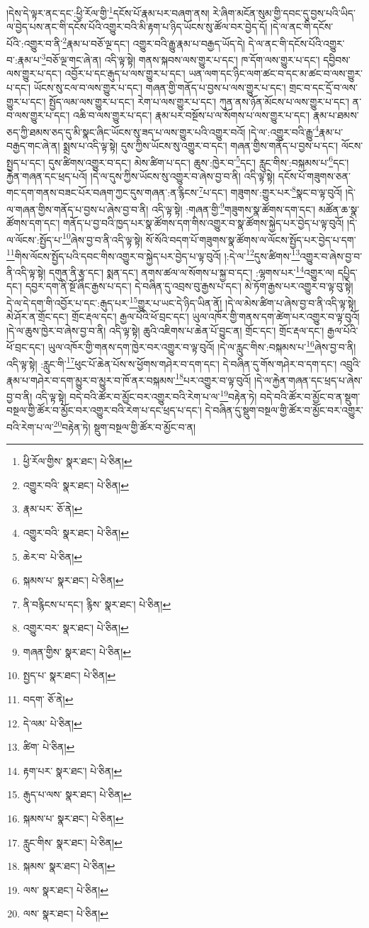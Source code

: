 །དེས་དེ་ལྟར་ནང་དང་:ཕྱི་རོལ་གྱི་\footnote{ཕྱི་རོལ་གྱིས་  སྣར་ཐང་།  པེ་ཅིན། }དངོས་པོ་རྣམ་པར་བཞག་ནས། རེ་ཞིག་མངོན་སུམ་གྱི་དབང་དུ་བྱས་པའི་ཡིད་ལ་བྱེད་པས་ནང་གི་དངོས་པོའི་འགྱུར་བའི་མི་རྟག་པ་ཉིད་ཡོངས་སུ་ཚོལ་བར་བྱེད་དོ། །དེ་ལ་ནང་གི་དངོས་པོའི་:འགྱུར་བ་ནི་\footnote{འགྱུར་བའི་  སྣར་ཐང་།  པེ་ཅིན། }རྣམ་པ་བཅོ་ལྔ་དང་། འགྱུར་བའི་རྒྱུ་རྣམ་པ་བརྒྱད་ཡོད་དེ། དེ་ལ་ནང་གི་དངོས་པོའི་འགྱུར་བ་:རྣམ་པ་\footnote{རྣམ་པར་  ཅོ་ནེ། }བཅོ་ལྔ་གང་ཞེ་ན། འདི་ལྟ་སྟེ། གནས་སྐབས་ལས་གྱུར་པ་དང་། ཁ་དོག་ལས་གྱུར་པ་དང་། དབྱིབས་ལས་གྱུར་པ་དང་། འབྱོར་པ་དང་རྒུད་པ་ལས་གྱུར་པ་དང་། ཡན་ལག་དང་ཉིང་ལག་ཚང་བ་དང་མ་ཚང་བ་ལས་གྱུར་པ་དང་། ཡོངས་སུ་ངལ་བ་ལས་གྱུར་པ་དང་། གཞན་གྱི་གནོད་པ་བྱས་པ་ལས་གྱུར་པ་དང་། གྲང་བ་དང་དྲོ་བ་ལས་གྱུར་པ་དང་། སྤྱོད་ལམ་ལས་གྱུར་པ་དང་། རེག་པ་ལས་གྱུར་པ་དང་། ཀུན་ནས་ཉོན་མོངས་པ་ལས་གྱུར་པ་དང་། ན་བ་ལས་གྱུར་པ་དང་། འཆི་བ་ལས་གྱུར་པ་དང་། རྣམ་པར་བསྔོས་པ་ལ་སོགས་པ་ལས་གྱུར་པ་དང་། རྣམ་པ་ཐམས་ཅད་ཀྱི་ཐམས་ཅད་དུ་མི་སྣང་ཞིང་ཡོངས་སུ་ཟད་པ་ལས་གྱུར་པའི་འགྱུར་བའོ། །དེ་ལ་:འགྱུར་བའི་རྒྱུ་\footnote{འགྱུར་བའི་  སྣར་ཐང་།  པེ་ཅིན། }རྣམ་པ་བརྒྱད་གང་ཞེ་ན། སྨྲས་པ་འདི་ལྟ་སྟེ། དུས་ཀྱིས་ཡོངས་སུ་འགྱུར་བ་དང་། གཞན་གྱིས་གནོད་པ་བྱས་པ་དང་། ལོངས་སྤྱད་པ་དང་། དུས་ཚིགས་འགྱུར་བ་དང་། མེས་ཚིག་པ་དང་། ཆུས་:ཁྱེར་བ་\footnote{ཆེར་བ་  པེ་ཅིན། }དང་། རླུང་གིས་:བསྐམས་པ་\footnote{སྐམས་པ་  སྣར་ཐང་།  པེ་ཅིན། }དང་། རྐྱེན་གཞན་དང་ཕྲད་པའོ། །དེ་ལ་དུས་ཀྱིས་ཡོངས་སུ་འགྱུར་བ་ཞེས་བྱ་བ་ནི། འདི་ལྟ་སྟེ། དངོས་པོ་གཟུགས་ཅན་གང་དག་གནས་བཟང་པོར་བཞག་ཀྱང་དུས་གཞན་:ན་རྙིངས་\footnote{ནི་བརྙིངས་པ་དང་། རྙིས་  སྣར་ཐང་།  པེ་ཅིན། }པ་དང་། གཟུགས་:གྱུར་པར་\footnote{འགྱུར་བར་  སྣར་ཐང་།  པེ་ཅིན། }སྣང་བ་ལྟ་བུའོ། །དེ་ལ་གཞན་གྱིས་གནོད་པ་བྱས་པ་ཞེས་བྱ་བ་ནི། འདི་ལྟ་སྟེ། :གཞན་གྱི་\footnote{གཞན་གྱིས་  སྣར་ཐང་།  པེ་ཅིན། }གཟུགས་སྣ་ཚོགས་དག་དང་། མཚོན་ཆ་སྣ་ཚོགས་དག་དང་། གནོད་པ་བྱ་བའི་ཁྱད་པར་སྣ་ཚོགས་དག་གིས་འགྱུར་བ་སྣ་ཚོགས་སྐྱེད་པར་བྱེད་པ་ལྟ་བུའོ། །དེ་ལ་ལོངས་:སྤྱོད་པ་\footnote{སྤྱད་པ་  སྣར་ཐང་།  པེ་ཅིན། }ཞེས་བྱ་བ་ནི་འདི་ལྟ་སྟེ། སོ་སོའི་བདག་པོ་གཟུགས་སྣ་ཚོགས་ལ་ལོངས་སྤྱོད་པར་བྱེད་པ་དག་\footnote{བདག་  ཅོ་ནེ། }གིས་ལོངས་སྤྱོད་པའི་དབང་གིས་འགྱུར་བ་སྐྱེད་པར་བྱེད་པ་ལྟ་བུའོ། །:དེ་ལ་\footnote{དེ་ལམ་  པེ་ཅིན། }དུས་ཚིགས་\footnote{ཚིག་  པེ་ཅིན། }འགྱུར་བ་ཞེས་བྱ་བ་ནི་འདི་ལྟ་སྟེ། དགུན་ནི་རྩྭ་དང་། སྨན་དང་། ནགས་ཚལ་ལ་སོགས་པ་སྐྱ་བ་དང་། :ལྷགས་པར་\footnote{རྟག་པར་  སྣར་ཐང་།  པེ་ཅིན། }འགྱུར་ལ། དཔྱིད་དང་། དབྱར་དག་ནི་སྔོ་ཞིང་རྒྱས་པ་དང་། དེ་བཞིན་དུ་འབྲས་བུ་རྒྱས་པ་དང་། མེ་ཏོག་རྒྱས་པར་འགྱུར་བ་ལྟ་བུ་སྟེ། དེ་ལ་དེ་དག་གི་འབྱོར་པ་དང་:རྒུད་པར་\footnote{རྒུད་པ་ལས་  སྣར་ཐང་།  པེ་ཅིན། }གྱུར་པ་ཡང་དེ་ཉིད་ཡིན་ནོ། །དེ་ལ་མེས་ཚིག་པ་ཞེས་བྱ་བ་ནི་འདི་ལྟ་སྟེ། མེ་ཤོར་ན་གྲོང་དང་། གྲོང་རྡལ་དང་། རྒྱལ་པོའི་ཕོ་བྲང་དང་། ཡུལ་འཁོར་གྱི་གནས་དག་ཚེག་པར་འགྱུར་བ་ལྟ་བུའོ། །དེ་ལ་ཆུས་ཁྱེར་བ་ཞེས་བྱ་བ་ནི། འདི་ལྟ་སྟེ། ཆུའི་འཇིགས་པ་ཆེན་པོ་བྱུང་ན། གྲོང་དང་། གྲོང་རྡལ་དང་། རྒྱལ་པོའི་ཕོ་བྲང་དང་། ཡུལ་འཁོར་གྱི་གནས་དག་ཁྱེར་བར་འགྱུར་བ་ལྟ་བུའོ། །དེ་ལ་རླུང་གིས་:བསྐམས་པ་\footnote{སྐམས་པ་  སྣར་ཐང་།  པེ་ཅིན། }ཞེས་བྱ་བ་ནི། འདི་ལྟ་སྟེ། :རླུང་གི་\footnote{རླུང་གིས་  སྣར་ཐང་།  པེ་ཅིན། }ཕུང་པོ་ཆེན་པོས་ས་ཕྱོགས་གཤེར་བ་དག་དང་། དེ་བཞིན་དུ་གོས་གཤེར་བ་དག་དང་། འབྲུའི་རྣམ་པ་གཤེར་བ་དག་མྱུར་བ་མྱུར་བ་ཁོ་ནར་བསྐམས་\footnote{སྐམས་  སྣར་ཐང་།  པེ་ཅིན། }པར་འགྱུར་བ་ལྟ་བུའོ། །དེ་ལ་རྐྱེན་གཞན་དང་ཕྲད་པ་ཞེས་བྱ་བ་ནི། འདི་ལྟ་སྟེ། བདེ་བའི་ཚོར་བ་མྱོང་བར་འགྱུར་བའི་རེག་པ་ལ་\footnote{ལས་  སྣར་ཐང་།  པེ་ཅིན། }བརྟེན་ཏེ། བདེ་བའི་ཚོར་བ་མྱོང་བ་ན་སྡུག་བསྔལ་གྱི་ཚོར་བ་མྱོང་བར་འགྱུར་བའི་རེག་པ་དང་ཕྲད་པ་དང་། དེ་བཞིན་དུ་སྡུག་བསྔལ་གྱི་ཚོར་བ་མྱོང་བར་འགྱུར་བའི་རེག་པ་ལ་\footnote{ལས་  སྣར་ཐང་།  པེ་ཅིན། }བརྟེན་ཏེ། སྡུག་བསྔལ་གྱི་ཚོར་བ་མྱོང་བ་ན། 